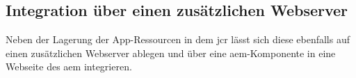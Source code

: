 \subsection{Integration über einen zusätzlichen Webserver}

Neben der Lagerung der App-Ressourcen in dem \ac{jcr} lässt sich diese ebenfalls auf einen zusätzlichen Webserver ablegen und über eine \ac{aem}-Komponente in eine Webseite des \ac{aem} integrieren.



